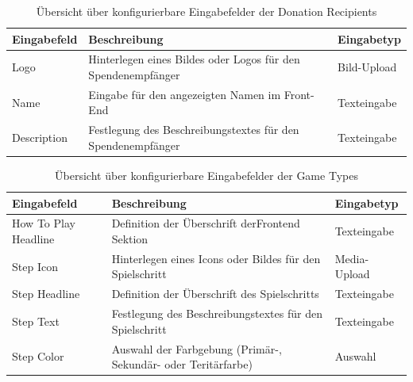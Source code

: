 \documentclass[
	ngerman,
	BCOR=8mm,
	headings=normal,
	parskip=half,
	headsepline,
	automark,
	listof=totoc,
	bibliography=totoc,
]{scrreprt}
\begin{document}
\begin{table}[h]
    \centering
    \renewcommand{\arraystretch}{1.3}
    \begin{tabular}{|p{3cm}|p{6cm}|p{5cm}|}
        \hline
        \textbf{Eingabefeld} & \textbf{Beschreibung} & \textbf{Eingabetyp} \\
        \hline
        Logo & Hinterlegen eines Bildes oder Logos für den Spendenempfänger & Bild-Upload \\
        \hline
        Name & Eingabe für den angezeigten Namen im Front-End & Texteingabe \\
        \hline
        Description & Festlegung des Beschreibungstextes für den Spendenempfänger  & Texteingabe \\
        \hline
    \end{tabular}
    \caption{Übersicht über konfigurierbare Eingabefelder der Donation Recipients}
    \label{tab:eingabefelder_donation_recipients}
\end{table}

\begin{table}[h]
    \centering
    \renewcommand{\arraystretch}{1.3}
    \begin{tabular}{|p{3cm}|p{6cm}|p{5cm}|}
        \hline
        \textbf{Eingabefeld} & \textbf{Beschreibung} & \textbf{Eingabetyp} \\
        \hline
        How To Play Headline & Definition der Überschrift der\newline Frontend Sektion & Texteingabe \\
        \hline
        Step Icon & Hinterlegen eines Icons oder Bildes für den Spielschritt & Media-Upload \\
        \hline
        Step Headline & Definition der Überschrift des Spielschritts & Texteingabe \\
        \hline
        Step Text & Festlegung des Beschreibungstextes für den Spielschritt  & Texteingabe \\
        \hline
        Step Color & Auswahl der Farbgebung (Primär-, Sekundär- oder Teritärfarbe)  & Auswahl \\
        \hline
    \end{tabular}
    \caption{Übersicht über konfigurierbare Eingabefelder der Game Types}
    \label{tab:eingabefelder_game_types}
\end{table}
\end{document}
